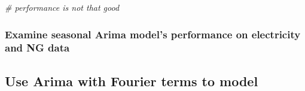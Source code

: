 \documentclass[
]{article}
\newenvironment{Shaded}{\begin{snugshade}}{\end{snugshade}}
\newcommand{\AttributeTok}[1]{\textcolor[rgb]{0.77,0.63,0.00}{#1}}
\newcommand{\CommentTok}[1]{\textcolor[rgb]{0.56,0.35,0.01}{\textit{#1}}}
\newcommand{\DecValTok}[1]{\textcolor[rgb]{0.00,0.00,0.81}{#1}}
\newcommand{\FunctionTok}[1]{\textcolor[rgb]{0.00,0.00,0.00}{#1}}
\newcommand{\NormalTok}[1]{#1}
\newcommand{\OtherTok}[1]{\textcolor[rgb]{0.56,0.35,0.01}{#1}}
\newcommand{\SpecialCharTok}[1]{\textcolor[rgb]{0.00,0.00,0.00}{#1}}
\begin{document}
\begin{Shaded}
\begin{Highlighting}[]
  \CommentTok{\# performance is not that good}
\end{Highlighting}
\end{Shaded}

\hypertarget{examine-seasonal-arima-models-performance-on-electricity-and-ng-data}{%
\subsubsection{Examine seasonal Arima model's performance on electricity
and NG
data}\label{examine-seasonal-arima-models-performance-on-electricity-and-ng-data}}

\begin{Shaded}
\end{Shaded}

\hypertarget{use-arima-with-fourier-terms-to-model}{%
\subsection{Use Arima with Fourier terms to
model}\label{use-arima-with-fourier-terms-to-model}}
\end{document}
